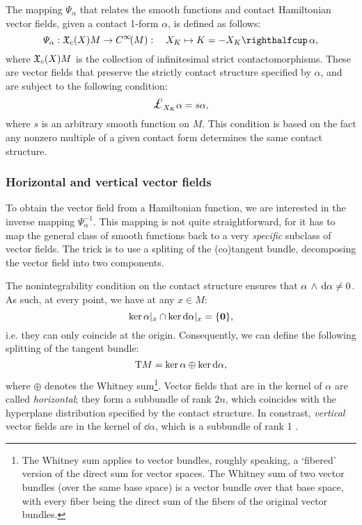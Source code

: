 The mapping $\Psi_\alpha$ that relates the smooth functions and contact Hamiltonian vector fields, given a contact 1-form $\alpha$, is defined as follows:
\begin{equation}
    \Psi_\alpha: \vsfields{c}{X}{M} \to \functions{M}: \quad X_K \mapsto K = -\intpr{X_K}{\alpha}, 
    \label{eq:psi_definition}
\end{equation}
where $\mathfrak{X}_{c}\qty(X){M}$ is the collection of infinitesimal strict contactomorphisms. These are vector fields that preserve the strictly contact structure specified by $\alpha$, and are subject to the following condition:
\begin{equation}
    \lied{X_K}{\alpha} = s \alpha, 
    \label{eq:contact_vf_condition}
\end{equation}
where $s$ is an arbitrary smooth function on $M$. This condition is based on the fact any nonzero multiple of a given contact form determines the same contact structure.

\subsubsection{Horizontal and vertical vector fields} 
To obtain the vector field from a Hamiltonian function, we are interested in the inverse mapping $\Psi^{-1}_\alpha$. This mapping is not quite straightforward, for it has to map the general class of smooth functions back to a very \emph{specific} subclass of vector fields. The trick is to use a spliting of the (co)tangent bundle, decomposing the vector field into two components. 

The nonintegrability condition on the contact structure ensures that $ \alpha\,\wedge\,\dd{\alpha}  \neq 0$. As such, at every point, we have at any $x\in M$:
$$ \ker{\alpha}\vert_x \cap \ker{\dd{\alpha}}\vert_x = \qty{\mathbf{0}}, $$
i.e. they can only coincide at the origin. Consequently, we can define the following splitting of the tangent bundle:
$$ \mathrm{T}M = \ker{\alpha}\oplus\ker{\dd{\alpha}}, $$
where $\oplus$ denotes the Whitney sum\footnote{The Whitney sum applies to vector bundles, roughly speaking, a `fibered' version of the direct sum for vector spaces. The Whitney sum of two vector bundles (over the same base space) is a vector bundle over that base space, with every fiber being the direct sum of the fibers of the original vector bundles.}. Vector fields that are in the kernel of $\alpha$ are called \emph{horizontal}; they form a subbundle of rank $2n$, which coincides with the hyperplane distribution specified by the contact structure. In constrast, \emph{vertical} vector fields are in the kernel of $\dd{\alpha}$, which is a subbundle of rank 1 \cite{Libermann1987}.

